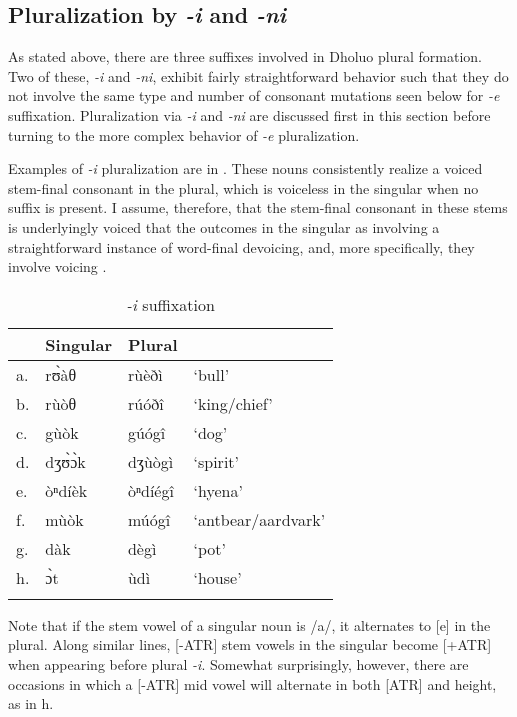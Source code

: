 \documentclass[output=paper,colorlinks,citecolor=brown]{langscibook}
\begin{document}
\subsection{Pluralization by \textit{-i} and \textit{-ni}}

As stated above, there are three suffixes involved in Dholuo plural formation. Two of these, \textit{-i} and \textit{-ni}, exhibit fairly straightforward behavior such that they do not involve the same type and number of consonant  mutations seen below for \textit{-e} suffixation. Pluralization via \textit{-i} and \textit{-ni} are discussed first in this section before turning to the more complex behavior of \textit{-e} pluralization.

Examples of \textit{-i} pluralization are in . These nouns consistently realize a voiced stem-final consonant in the plural, which is voiceless in the singular when no suffix is present. I assume, therefore, that the stem-final consonant in these stems is underlyingly voiced that the outcomes in the singular as involving a straightforward instance of  word-final devoicing, and, more specifically, they involve voicing .

\begin{table}
\caption{\textit{-i} suffixation}
\label{tab:ISuffixation}
 \begin{tabular}{llll}
  \lsptoprule
& Singular & Plural &  \\
\midrule
a.	&rʊ̀àθ&	rùèðì&	`bull' \\
b.&	rùòθ&	rúóðî&	`king/chief' \\
c.	&gùòk&	gúógî&	`dog' \\
d.	&dʒʊ̀ɔ̀k	&dʒùògì	&`spirit' \\
e.&	òⁿdíèk&	òⁿdíégî&	`hyena' \\
f.&	mùòk	&múógî&	`antbear/aardvark' \\
g.&	dàk	&dègì&	`pot' \\
h.&	ɔ̀t&	ùdì &	`house' \\
  \lspbottomrule
 \end{tabular}
\end{table}  

Note that if the stem vowel of a singular noun is /a/, it alternates to [e] in the plural. Along similar lines, [-ATR] stem vowels in the  singular become [+ATR] when appearing before plural \textit{-i}. Somewhat surprisingly, however, there are occasions in which a [-ATR] mid vowel will alternate in both [ATR] and height, as in h.
\end{document}
